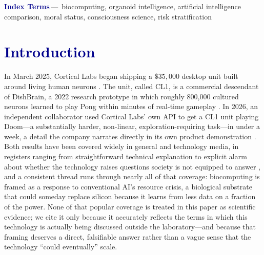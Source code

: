 \documentclass[journal]{IEEEtran}
\begin{document}
\begin{IEEEkeywords}
\begin{mdframed}[
  linecolor=darkblue, linewidth=0.8pt,
  backgroundcolor=darkblue!3,
  innerleftmargin=8pt, innerrightmargin=8pt,
  innertopmargin=6pt, innerbottommargin=6pt,
  roundcorner=4pt, skipabove=4pt, skipbelow=0pt
]
\noindent\textbf{\textcolor{darkblue}{Index Terms}}\,---~biocomputing, organoid
intelligence, artificial intelligence comparison, moral status, consciousness
science, risk stratification
\end{mdframed}
\end{IEEEkeywords}

\section{\textcolor{darkblue}{Introduction}}

In March 2025, Cortical Labs began shipping a $\$35{,}000$ desktop unit built around
living human neurons \cite{corticallabs2025cl1}. The unit, called CL1, is a commercial
descendant of DishBrain, a 2022 research prototype in which roughly 800{,}000 cultured
neurons learned to play Pong within minutes of real-time gameplay
\cite{kagan2022dishbrain}. In 2026, an independent collaborator used Cortical Labs'
own API to get a CL1 unit playing Doom---a substantially harder, non-linear,
exploration-requiring task---in under a week, a detail the company narrates directly
in its own product demonstration \cite{corticallabs2026doom}. Both results have been
covered widely in general and technology media, in registers ranging from
straightforward technical explanation \cite{bloomberg2025biocomputing} to explicit
alarm about whether the technology raises questions society is not equipped to answer
\cite{notready2026biocomputing}, and a consistent thread runs through nearly all of
that coverage: biocomputing is framed as a response to conventional AI's resource
crisis, a biological substrate that could someday replace silicon because it learns
from less data on a fraction of the power. None of that popular coverage is treated
in this paper as scientific evidence; we cite it only because it accurately reflects
the terms in which this technology is actually being discussed outside the
laboratory---and because that framing deserves a direct, falsifiable answer rather
than a vague sense that the technology ``could eventually'' scale.
\end{document}
